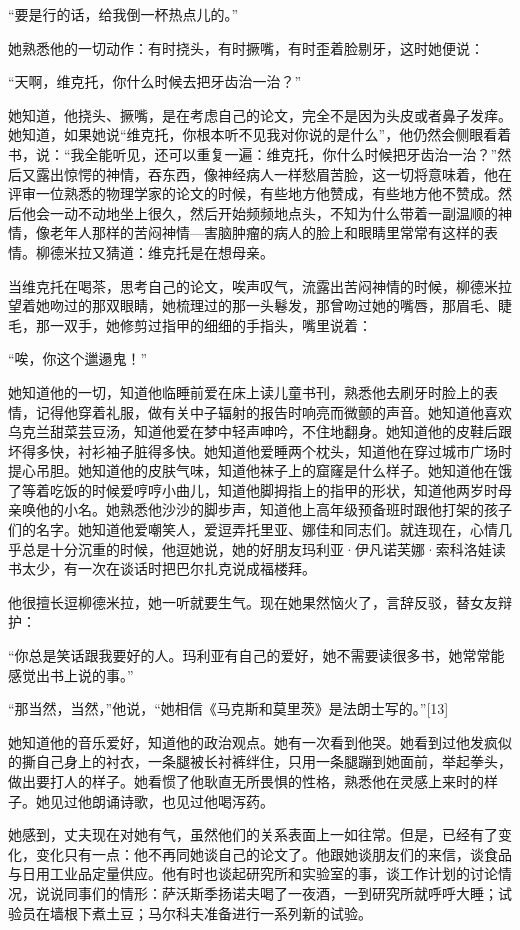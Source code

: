 “要是行的话，给我倒一杯热点儿的。”

她熟悉他的一切动作：有时挠头，有时撅嘴，有时歪着脸剔牙，这时她便说：

“天啊，维克托，你什么时候去把牙齿治一治？”

她知道，他挠头、撅嘴，是在考虑自己的论文，完全不是因为头皮或者鼻子发痒。她知道，如果她说“维克托，你根本听不见我对你说的是什么”，他仍然会侧眼看着书，说：“我全能听见，还可以重复一遍：维克托，你什么时候把牙齿治一治？”然后又露出惊愕的神情，吞东西，像神经病人一样愁眉苦脸，这一切将意味着，他在评审一位熟悉的物理学家的论文的时候，有些地方他赞成，有些地方他不赞成。然后他会一动不动地坐上很久，然后开始频频地点头，不知为什么带着一副温顺的神情，像老年人那样的苦闷神情—害脑肿瘤的病人的脸上和眼睛里常常有这样的表情。柳德米拉又猜道：维克托是在想母亲。

当维克托在喝茶，思考自己的论文，唉声叹气，流露出苦闷神情的时候，柳德米拉望着她吻过的那双眼睛，她梳理过的那一头鬈发，那曾吻过她的嘴唇，那眉毛、睫毛，那一双手，她修剪过指甲的细细的手指头，嘴里说着：

“唉，你这个邋遢鬼！”

她知道他的一切，知道他临睡前爱在床上读儿童书刊，熟悉他去刷牙时脸上的表情，记得他穿着礼服，做有关中子辐射的报告时响亮而微颤的声音。她知道他喜欢乌克兰甜菜芸豆汤，知道他爱在梦中轻声呻吟，不住地翻身。她知道他的皮鞋后跟坏得多快，衬衫袖子脏得多快。她知道他爱睡两个枕头，知道他在穿过城市广场时提心吊胆。她知道他的皮肤气味，知道他袜子上的窟窿是什么样子。她知道他在饿了等着吃饭的时候爱哼哼小曲儿，知道他脚拇指上的指甲的形状，知道他两岁时母亲唤他的小名。她熟悉他沙沙的脚步声，知道他上高年级预备班时跟他打架的孩子们的名字。她知道他爱嘲笑人，爱逗弄托里亚、娜佳和同志们。就连现在，心情几乎总是十分沉重的时候，他逗她说，她的好朋友玛利亚·伊凡诺芙娜·索科洛娃读书太少，有一次在谈话时把巴尔扎克说成福楼拜。

他很擅长逗柳德米拉，她一听就要生气。现在她果然恼火了，言辞反驳，替女友辩护：

“你总是笑话跟我要好的人。玛利亚有自己的爱好，她不需要读很多书，她常常能感觉出书上说的事。”

“那当然，当然，”他说，“她相信《马克斯和莫里茨》是法朗士写的。”[13]

她知道他的音乐爱好，知道他的政治观点。她有一次看到他哭。她看到过他发疯似的撕自己身上的衬衣，一条腿被长衬裤绊住，只用一条腿蹦到她面前，举起拳头，做出要打人的样子。她看惯了他耿直无所畏惧的性格，熟悉他在灵感上来时的样子。她见过他朗诵诗歌，也见过他喝泻药。

她感到，丈夫现在对她有气，虽然他们的关系表面上一如往常。但是，已经有了变化，变化只有一点：他不再同她谈自己的论文了。他跟她谈朋友们的来信，谈食品与日用工业品定量供应。他有时也谈起研究所和实验室的事，谈工作计划的讨论情况，说说同事们的情形：萨沃斯季扬诺夫喝了一夜酒，一到研究所就呼呼大睡；试验员在墙根下煮土豆；马尔科夫准备进行一系列新的试验。

